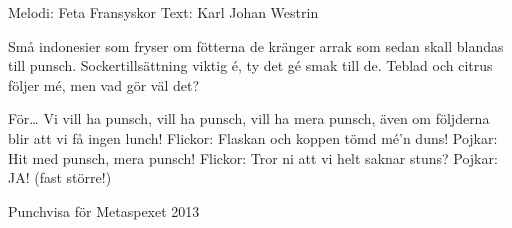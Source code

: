\begin{song}


\begin{songmeta}
Melodi: Feta Fransyskor
Text: Karl Johan Westrin
\end{songmeta}

\begin{songtext}
Små indonesier som fryser om fötterna
de kränger arrak som sedan skall blandas till punsch.
Sockertillsättning viktig é,
ty det gé smak till de.
Teblad och citrus följer mé,
men vad gör väl det?

För\ldots
Vi vill ha punsch, vill ha punsch, vill ha mera punsch,
även om följderna blir att vi få ingen lunch!
Flickor: Flaskan och koppen tömd mé'n duns!
Pojkar: Hit med punsch, mera punsch!
Flickor: Tror ni att vi helt saknar stuns?
Pojkar: JA! (fast större!)
\end{songtext}

\begin{songnotes}
Punchvisa för Metaspexet 2013
\end{songnotes}

\end{song}

